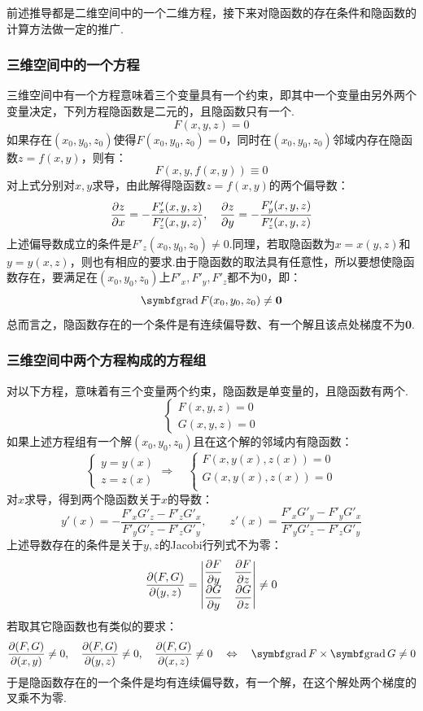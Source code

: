 前述推导都是二维空间中的一个二维方程，接下来对隐函数的存在条件和隐函数的计算方法做一定的推广.
\subsubsection{三维空间中的一个方程}
三维空间中有一个方程意味着三个变量具有一个约束，即其中一个变量由另外两个变量决定，下列方程隐函数是二元的，且隐函数只有一个.
\[F(x,y,z) = 0\]
如果存在$(x_0,y_0,z_0)$使得$F(x_0,y_0,z_0) = 0$，同时在$(x_0,y_0,z_0)$邻域内存在隐函数$z = f(x,y)$，则有：
\[F(x,y,f(x,y)) \equiv 0\]
对上式分别对$x,y$求导，由此解得隐函数$z = f(x,y)$的两个偏导数：
\[\pdv{z}{x} = -\frac{F'_x(x,y,z)}{F'_z(x,y,z)},\quad\pdv{z}{y} = -\frac{F'_y(x,y,z)}{F'_z(x,y,z)}\]
上述偏导数成立的条件是$F'_z(x_0,y_0,z_0) \neq 0$.同理，若取隐函数为$x = x(y,z)$和$y = y(x,z)$，则也有相应的要求.由于隐函数的取法具有任意性，所以要想使隐函数存在，要满足在$(x_0,y_0,z_0)$上$F'_x,F'_y,F'_z$都不为$0$，即：
\[\grad F(x_0,y_0,z_0) \neq \bm{0}\]
总而言之，隐函数存在的一个条件是有连续偏导数、有一个解且该点处梯度不为$\bm{0}$.


\subsubsection{三维空间中两个方程构成的方程组}
对以下方程，意味着有三个变量两个约束，隐函数是单变量的，且隐函数有两个.
\[\begin{cases}
    F(x,y,z) = 0 \\
    G(x,y,z) = 0
\end{cases}\]
如果上述方程组有一个解$(x_0,y_0,z_0)$且在这个解的邻域内有隐函数：
\[\begin{cases}
    y = y(x)\\
    z = z(x)
\end{cases} \Rightarrow\quad \begin{cases}
    F(x,y(x),z(x)) = 0\\
    G(x,y(x),z(x)) = 0\\
\end{cases}\]
对$x$求导，得到两个隐函数关于$x$的导数：
\[y'(x) = -\frac{F'_x G'_z - F'_z G'_x}{F'_y G'_z - F'_z G'_y},\qquad z'(x) = \frac{F'_x G'_y - F'_y G'_x}{F'_y G'_z - F'_z G'_y}\]
上述导数存在的条件是关于$y,z$的Jacobi行列式不为零：
\[\pdv{(F,G)}{(y,z)} = \begin{vmatrix}
    \displaystyle\pdv{F}{y} & \displaystyle\pdv{F}{z} \\
    \displaystyle\pdv{G}{y} & \displaystyle\pdv{G}{z} \\
\end{vmatrix} \neq 0\]
若取其它隐函数也有类似的要求：
\[\pdv{(F,G)}{(x,y)} \neq 0,\quad \pdv{(F,G)}{(y,z)} \neq 0,\quad\pdv{(F,G)}{(x,z)} \neq 0 \quad\Leftrightarrow\quad \grad F \times \grad G \neq 0\]
于是隐函数存在的一个条件是均有连续偏导数，有一个解，在这个解处两个梯度的叉乘不为零.


